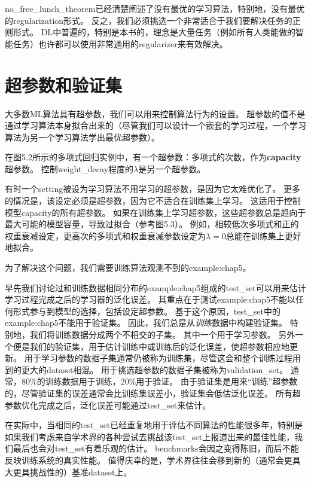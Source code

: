 \gls{no_free_lunch_theorem}已经清楚阐述了没有最优的学习算法，特别地，没有最优的\gls{regularization}形式。
反之，我们必须挑选一个非常适合于我们要解决任务的正则形式。
\gls{DL}中普遍的，特别是本书的，理念是大量任务（例如所有人类能做的智能任务）也许都可以使用非常通用的\gls{regularizer}来有效解决。

\section{超参数和验证集}
\label{sec:hyperparameters_and_validation_sets}
大多数\gls{ML}算法具有超参数，我们可以用来控制算法行为的设置。
超参数的值不是通过学习算法本身拟合出来的（尽管我们可以设计一个嵌套的学习过程，一个学习算法为另一个学习算法学出最优超参数）。

在图5.2所示的多项式回归实例中，有一个超参数：多项式的次数，作为\textbf{\gls{capacity}}超参数。
控制\gls{weight_decay}程度的$\lambda$是另一个超参数。

有时一个\gls{setting}被设为学习算法不用学习的超参数，是因为它太难优化了。
更多的情况是，该设定必须是超参数，因为它不适合在训练集上学习。
这适用于控制模型\gls{capacity}的所有超参数。
如果在训练集上学习超参数，这些超参数总是趋向于最大可能的模型容量，导致过拟合（参考图5.3）。
例如，相较低次多项式和正的权重衰减设定，更高次的多项式和权重衰减参数设定为$\lambda=0$总能在训练集上更好地拟合。


为了解决这个问题，我们需要训练算法观测不到的\gls{example:chap5}。

早先我们讨论过和训练数据相同分布的\gls{example:chap5}组成的\gls{test_set}可以用来估计学习过程完成之后的学习器的泛化误差。
其重点在于测试\gls{example:chap5}不能以任何形式参与到模型的选择，包括设定超参数。
基于这个原因，\gls{test_set}中的\gls{example:chap5}不能用于验证集。
因此，我们总是从\emph{训练}数据中构建验证集。
特别地，我们将训练数据分成两个不相交的子集。
其中一个用于学习参数。
另外一个便是我们的验证集，用于估计训练中或训练后的泛化误差，使超参数相应地更新。
用于学习参数的数据子集通常仍被称为训练集，尽管这会和整个训练过程用到的更大的\gls{dataset}相混。
用于挑选超参数的数据子集被称为\gls{validation_set}。
通常，$80\%$的训练数据用于训练，$20\%$用于验证。
由于验证集是用来“训练”超参数的，尽管验证集的误差通常会比训练集误差小，验证集会低估泛化误差。
所有超参数优化完成之后，泛化误差可能通过\gls{test_set}来估计。

在实际中，当相同的\gls{test_set}已经重复地用于评估不同算法的性能很多年，特别是如果我们考虑来自学术界的各种尝试去挑战该\gls{test_set}上报道出来的最佳性能，我们最后也会对\gls{test_set}有着乐观的估计。
\gls{benchmarks}会因之变得陈旧，而后不能反映训练系统的真实性能。
值得庆幸的是，学术界往往会移到新的（通常会更具大更具挑战性的）基准\gls{dataset}上。

